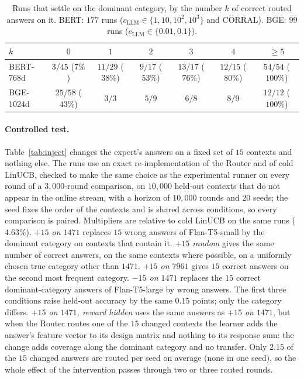 \documentclass{article}
\theoremstyle{definition}
\theoremstyle{remark}
\theoremstyle{remark}
\begin{document}
\begin{table}[h]
\centering
\caption{Runs that settle on the dominant category, by the number $k$ of
correct routed answers on it. BERT: $177$ runs ($c_{\mathrm{LLM}}\in\{1,10,10^2,10^3\}$ and
CORRAL). BGE: $99$ runs ($c_{\mathrm{LLM}}\in\{0.01,0.1\}$).}
\label{tab:dose}
\small
\begin{tabular}{@{}lcccccc@{}}
\toprule
$k$ & $0$ & $1$ & $2$ & $3$ & $4$ & $\ge5$ \\
\midrule
BERT-768d & $3/45$ ($7\%$) & $11/29$ ($38\%$) & $9/17$ ($53\%$) & $13/17$ ($76\%$) & $12/15$ ($80\%$) & $54/54$ ($100\%$) \\
BGE-1024d & $25/58$ ($43\%$) & $3/3$ & $5/9$ & $6/8$ & $8/9$ & $12/12$ ($100\%$) \\
\bottomrule
\end{tabular}
\end{table}

\paragraph{Controlled test.}
Table~\ref{tab:inject} changes the expert's answers on a fixed set of $15$
contexts and nothing else. The runs use an exact re-implementation of the
Router and of cold LinUCB, checked to make the same choice as the
experimental runner on every round of a $3{,}000$-round comparison, on
$10{,}000$ held-out contexts that do not appear in the online stream, with a
horizon of $10{,}000$ rounds and $20$ seeds; the seed fixes the order of the
contexts and is shared across conditions, so every comparison is paired.
Multipliers are relative to cold LinUCB on the same runs ($4.63\%$).
\emph{$+15$ on $1471$} replaces $15$ wrong answers of Flan-T5-small by the
dominant category on contexts that contain it. \emph{$+15$ random} gives the
same number of correct answers, on the same contexts where possible, on a
uniformly chosen true category other than $1471$. \emph{$+15$ on $7961$}
gives $15$ correct answers on the second most frequent category.
\emph{$-15$ on $1471$} replaces the $15$ correct dominant-category answers of
Flan-T5-large by wrong answers. The first three conditions raise held-out
accuracy by the same $0.15$ points; only the category differs.
\emph{$+15$ on $1471$, reward hidden} uses the same answers as \emph{$+15$ on
$1471$}, but when the Router routes one of the $15$ changed contexts the
learner adds the answer's feature vector to its design matrix and nothing to
its response sum: the change adds coverage along the dominant category and no
transfer. Only $2.15$ of the $15$ changed answers are routed per seed on
average (none in one seed), so the whole effect of the intervention passes
through two or three routed rounds.
\end{document}
